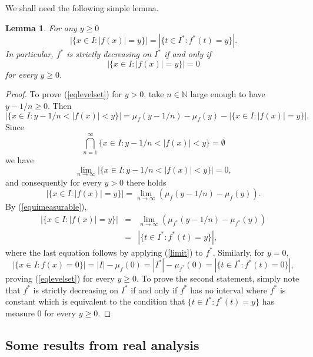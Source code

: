 \documentclass{amsart}
\newtheorem{lem}[theorem]{Lemma}
\numberwithin{equation}{section}
\begin{document}
We shall need the following simple lemma.
\begin{lem}
    \label{decreasingLem}
    For any $y\ge0$
    \begin{equation}
        \label{eqlevelset}
        |\{x\in I:|f(x)|=y\}|=|\{t\in I^*:f^*(t)=y\}|.
    \end{equation}
    In particular, $f^*$ is strictly decreasing on $I^*$ if and only if 
    $$
    |\{x\in I:|f(x)|=y\}|=0
    $$
    for every $y\ge0$.
\end{lem}
\begin{proof}
    To prove (\ref{eqlevelset}) for $y>0$, take $n\in\mathbb{N}$ large enough to have $y-1/n\ge0$. Then
    \begin{equation}
        \nonumber
        |\{x\in I:y-1/n<|f(x)|<y\}|=\mu_f(y-1/n)-\mu_f(y)-|\{x\in I:|f(x)|=y\}|.
    \end{equation}
    Since 
    $$
    \bigcap_{n=1}^\infty\{x\in I:y-1/n<|f(x)|<y\}=\emptyset
    $$
    we have
    $$
    \lim_{n\rightarrow\infty}|\{x\in I:y-1/n<|f(x)|<y\}|=0,
    $$
    and consequently for every $y>0$ there holds
    \begin{equation}
        \label{limit}
        |\{x\in I:|f(x)|=y\}|=\lim_{n\rightarrow\infty}(\mu_f(y-1/n)-\mu_f(y)).
    \end{equation}
    By (\ref{equimeasurable}),
    \begin{eqnarray}
        \nonumber
        |\{x\in I:|f(x)|=y\}|&=&\lim_{n\rightarrow\infty}(\mu_{f^*}(y-1/n)-\mu_{f^*}(y))\\
        \nonumber
        &=&|\{t\in I^*:f^*(t)=y\}|,
    \end{eqnarray}
    where the last equation follows by applying (\ref{limit}) to $f^*$. Similarly, for $y=0$,
    \begin{equation}
        \nonumber
        |\{x\in I:f(x)=0\}|=|I|-\mu_f(0)=|I^*|-\mu_{f^*}(0)=|\{t\in I^*:f^*(t)=0\}|,
    \end{equation}
    proving (\ref{eqlevelset}) for every $y\ge0$.
    To prove the second statement, simply note that $f^*$ is strictly decreasing on $I^*$ if and only if $f^*$ has no interval where $f^*$ is constant which is equivalent to the condition that $\{t\in I^*:f^*(t)=y\}$ has measure 0 for every $y\ge0$.
\end{proof}

\subsection{Some results from real analysis}
\end{document}

